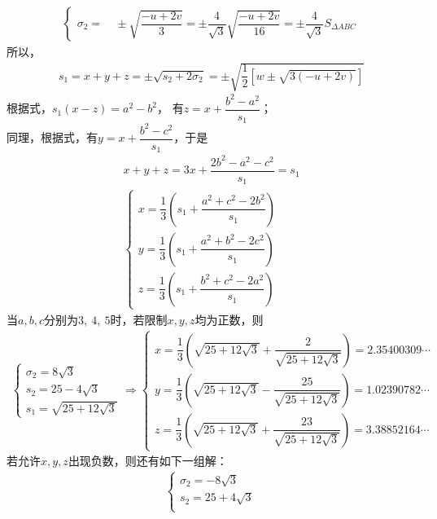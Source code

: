 \begin{enumerate}[label={【\textbf{例\thechapter.\arabic*}】},
 leftmargin=\inteval{\myenumleftmargin}pt,
 itemsep=\inteval{\myenumitempsep}pt,
 itemindent=\inteval{\myenumitemindent}pt]
\begin{align*}
\begin{cases}
        \sigma_2=&\ \pm \sqrt{\dfrac{-u+2v}{3}}=
        \pm \dfrac{4}{\sqrt{3}}\sqrt{\dfrac{-u+2v}{16}}=
        \pm\dfrac{4}{\sqrt{3}}S_{\Delta ABC} 
    \end{cases}
\end{align*}
所以，
\begin{gather*}
    s_1=x+y+z=\pm\sqrt{s_2+2\sigma_2 }=
    \pm \sqrt{\dfrac{1}{2}[w\pm\sqrt{3(-u+2v)}]}
\end{gather*}
根据式，$ s_1(x-z)=a^2-b^2 $，
有$ z=x+\dfrac{b^2-a^2}{s_1} $；\\
同理，根据式，有$ y=x+\dfrac{b^2-c^2}{s_1} $，于是
\begin{gather*}
    x+y+z=3x+\dfrac{2b^2-a^2-c^2}{s_1}=s_1 \\
    \begin{cases}
        x=\dfrac{1}{3}\left(s_1+\dfrac{a^2+c^2-2b^2}{s_1}\right)\\[3mm]
        y=\dfrac{1}{3}\left(s_1+\dfrac{a^2+b^2-2c^2}{s_1}\right)\\[3mm]
        z=\dfrac{1}{3}\left(s_1+\dfrac{b^2+c^2-2a^2}{s_1}\right)
    \end{cases}
\end{gather*}
当$ a,b,c $分别为$ 3,\ 4,\ 5 $时，若限制$ x,y,z $均为正数，则
\begin{gather*}
\begin{cases}
    \sigma_2 =8\sqrt{3} \\        
    s_2 =25- 4\sqrt{3} \\
    s_1=\sqrt{25 + 12\sqrt{3}}
\end{cases}
\Rightarrow 
\begin{cases}
    x =\dfrac{1}{3}\left(\sqrt{25 + 12\sqrt{3}}+
    \dfrac{2}{\sqrt{25 + 12\sqrt{3}}}\right)=2.35400309 \cdots\\
    y =\dfrac{1}{3}\left(\sqrt{25 + 12\sqrt{3}}-
    \dfrac{25}{\sqrt{25 + 12\sqrt{3}}}\right)= 1.02390782 \cdots\\
    z =\dfrac{1}{3}\left(\sqrt{25 + 12\sqrt{3}}+
    \dfrac{23}{\sqrt{25 + 12\sqrt{3}}}\right)= 3.38852164 \cdots 
\end{cases}
\end{gather*}
若允许$ x,y,z $出现负数，则还有如下一组解：
\begin{align*}
    \begin{cases}
        \sigma_2 = -8\sqrt{3} \\        
        s_2 = 25+ 4\sqrt{3} \\

\end{cases}
\end{align*}
\end{enumerate}
